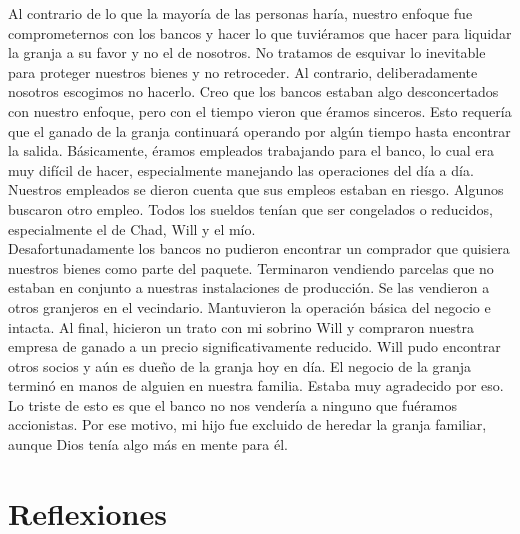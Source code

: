\documentclass[twoside, 12pt]{book}
\begin{document}
Al contrario de lo que la mayoría de las personas haría, nuestro enfoque fue comprometernos con los bancos y hacer lo que tuviéramos que hacer para liquidar la granja a su favor y no el de nosotros. No tratamos de esquivar lo inevitable para proteger nuestros bienes y no retroceder. Al contrario, deliberadamente nosotros escogimos no hacerlo. Creo que los bancos estaban algo desconcertados con nuestro enfoque, pero con el tiempo vieron que éramos sinceros. Esto requería que el ganado de la granja continuará operando por algún tiempo hasta encontrar la salida. Básicamente, éramos empleados trabajando para el banco, lo cual era muy difícil de hacer, especialmente manejando las operaciones del día a día. Nuestros empleados se dieron cuenta que sus empleos estaban en riesgo. Algunos buscaron otro empleo. Todos los sueldos tenían que ser congelados o reducidos, especialmente el de Chad, Will y el mío.\\

Desafortunadamente los bancos no pudieron encontrar un comprador que quisiera nuestros bienes como parte del paquete. Terminaron vendiendo parcelas que no estaban en conjunto a nuestras instalaciones de producción. Se las vendieron a otros granjeros en el vecindario. Mantuvieron la operación básica del negocio e intacta. Al final, hicieron un trato con mi sobrino Will y compraron nuestra empresa de ganado a un precio significativamente reducido. Will pudo encontrar otros socios y aún es dueño de la granja hoy en día. El negocio de la granja terminó en manos de alguien en nuestra familia. Estaba muy agradecido por eso. Lo triste de esto es que el banco no nos vendería a ninguno que fuéramos accionistas. Por ese motivo, mi hijo fue excluido de heredar la granja familiar, aunque Dios tenía algo más en mente para él.\\

\section{Reflexiones}
\end{document}
